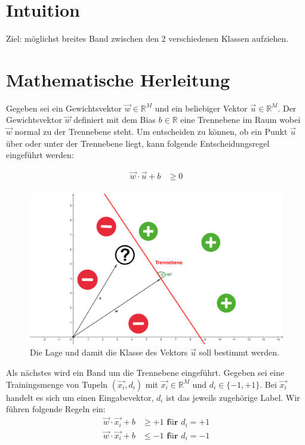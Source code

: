 \documentclass[a4paper,11pt,twoside]{scrreprt}
\begin{document}
\section{Intuition}
Ziel: möglichst breites Band zwischen den 2 verschiedenen Klassen aufziehen.

\section{Mathematische Herleitung}
Gegeben sei ein Gewichtsvektor $\vec{w} \in \mathbb{R}^{M}$ und ein beliebiger Vektor $\vec{u} \in \mathbb{R}^{M}$. Der Gewichtsvektor $\vec{w}$ definiert mit dem Bias $b \in \mathbb{R}$ eine Trennebene im Raum wobei $\vec{w}$ normal zu der Trennebene steht. Um entscheiden zu können, ob ein Punkt $\vec{u}$ über oder unter der Trennebene liegt, kann folgende Entscheidungsregel eingeführt werden:

\begin{equation} \label{dec_rule}
    \begin{aligned}
    \vec{w} \cdot \vec{u} + b & \geq 0 \\
    \end{aligned}
\end{equation}


\begin{figure}[H]
	\centering
	\includegraphics{assets/trennebene.png}
	\caption{Die Lage und damit die Klasse des Vektors $\vec{u}$ soll bestimmt werden.}
	\label{fig:trennebene}
\end{figure}


Als nächstes wird ein Band um die Trennebene eingeführt. Gegeben sei eine Trainingsmenge von Tupeln $(\vec{x_{i}}, d_{i})$ mit $\vec{x_{i}} \in \mathbb{R}^{M}$ und $d_{i} \in \{-1, +1\}$. Bei $\vec{x_{i}}$ handelt es sich um einen Eingabevektor, $d_{i}$ ist das jeweils zugehörige Label. Wir führen folgende Regeln ein:
\begin{equation} \label{band_rules}
    \begin{aligned}
    \vec{w} \cdot \vec{x_{i}} + b & \geq +1 \textbf{ für $d_{i} = +1$} \\
    \vec{w} \cdot \vec{x_{i}} + b & \leq -1 \textbf{ für $d_{i} = -1$}
    \end{aligned}
\end{equation}
\end{document}
